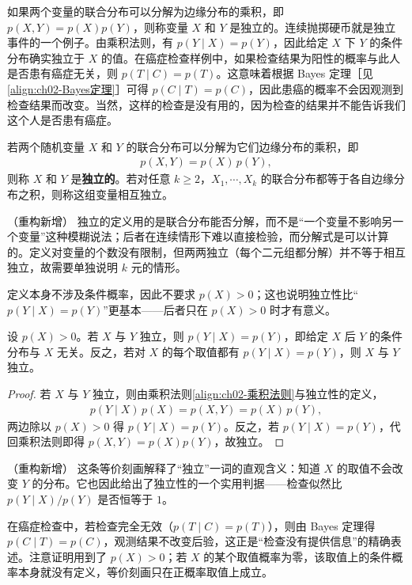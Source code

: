 \documentclass[../../main.tex]{subfiles}
\begin{document}
如果两个变量的联合分布可以分解为边缘分布的乘积，即 $p(X,Y)=p(X)p(Y)$，则称变量 $X$ 和 $Y$ 是独立的。连续抛掷硬币就是独立事件的一个例子。由乘积法则，有 $p(Y\mid X)=p(Y)$，因此给定 $X$ 下 $Y$ 的条件分布确实独立于 $X$ 的值。在癌症检查样例中，如果检查结果为阳性的概率与此人是否患有癌症无关，则 $p(T\mid C)=p(T)$。这意味着根据 Bayes 定理［见\eqref{align:ch02-Bayes定理}］可得 $p(C\mid T)=p(C)$，因此患癌的概率不会因观测到检查结果而改变。当然，这样的检查是没有用的，因为检查的结果并不能告诉我们这个人是否患有癌症。

\begin{definition}[独立变量]\label{definition:ch02-独立变量}
若两个随机变量 $X$ 和 $Y$ 的联合分布可以分解为它们边缘分布的乘积，即
\begin{align*}
  p(X,Y) = p(X)\,p(Y) ,
\end{align*}
则称 $X$ 和 $Y$ 是\textbf{独立的}。若对任意 $k\geqslant2$，$X_1,\cdots,X_k$ 的联合分布都等于各自边缘分布之积，则称这组变量相互独立。
\end{definition}

\begin{remark}（重构新增）
独立的定义用的是联合分布能否分解，而不是“一个变量不影响另一个变量”这种模糊说法；后者在连续情形下难以直接检验，而分解式是可以计算的。定义对变量的个数没有限制，但两两独立（每个二元组都分解）并不等于相互独立，故需要单独说明 $k$ 元的情形。

定义本身不涉及条件概率，因此不要求 $p(X)>0$；这也说明独立性比“$p(Y\mid X)=p(Y)$”更基本——后者只在 $p(X)>0$ 时才有意义。
\end{remark}

\begin{proposition}[独立性的条件概率刻画]\label{proposition:ch02-独立性刻画}
设 $p(X)>0$。若 $X$ 与 $Y$ 独立，则 $p(Y\mid X)=p(Y)$，即给定 $X$ 后 $Y$ 的条件分布与 $X$ 无关。反之，若对 $X$ 的每个取值都有 $p(Y\mid X)=p(Y)$，则 $X$ 与 $Y$ 独立。
\end{proposition}

\begin{proof}
若 $X$ 与 $Y$ 独立，则由乘积法则\eqref{align:ch02-乘积法则}与独立性的定义，
\begin{align*}
  p(Y\mid X)\,p(X) = p(X,Y) = p(X)\,p(Y) ,
\end{align*}
两边除以 $p(X)>0$ 得 $p(Y\mid X)=p(Y)$。反之，若 $p(Y\mid X)=p(Y)$，代回乘积法则即得 $p(X,Y)=p(X)p(Y)$，故独立。
\end{proof}

\begin{remark}（重构新增）
这条等价刻画解释了“独立”一词的直观含义：知道 $X$ 的取值不会改变 $Y$ 的分布。它也因此给出了独立性的一个实用判据——检查似然比 $p(Y\mid X)/p(Y)$ 是否恒等于 $1$。

在癌症检查中，若检查完全无效（$p(T\mid C)=p(T)$），则由 Bayes 定理得 $p(C\mid T)=p(C)$，观测结果不改变后验，这正是“检查没有提供信息”的精确表述。注意证明用到了 $p(X)>0$；若 $X$ 的某个取值概率为零，该取值上的条件概率本身就没有定义，等价刻画只在正概率取值上成立。
\end{remark}
\end{document}
